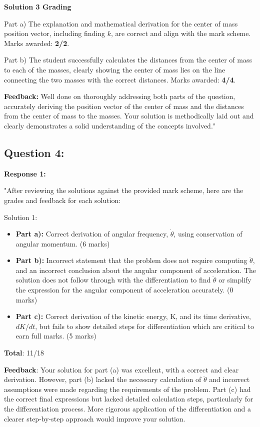\documentclass[a4paper,11pt]{article}
\begin{document}
\hrulefill

\textbf{Solution 3 Grading}

Part a) The explanation and mathematical derivation for the center of mass position vector, including finding \( k \), are correct and align with the mark scheme. Marks awarded: \textbf{2/2}.

Part b) The student successfully calculates the distances from the center of mass to each of the masses, clearly showing the center of mass lies on the line connecting the two masses with the correct distances. Marks awarded: \textbf{4/4}.

\textbf{Feedback:} Well done on thoroughly addressing both parts of the question, accurately deriving the position vector of the center of mass and the distances from the center of mass to the masses. Your solution is methodically laid out and clearly demonstrates a solid understanding of the concepts involved."

\subsection*{Question 4:}

\textbf{Response 1:}

"After reviewing the solutions against the provided mark scheme, here are the grades and feedback for each solution:

Solution 1:

\begin{itemize}
    \item \textbf{Part a):} Correct derivation of angular frequency, $\dot{\theta}$, using conservation of angular momentum. (6 marks)
    \item \textbf{Part b):} Incorrect statement that the problem does not require computing $\ddot{\theta}$, and an incorrect conclusion about the angular component of acceleration. The solution does not follow through with the differentiation to find $\ddot{\theta}$ or simplify the expression for the angular component of acceleration accurately. (0 marks)
    \item \textbf{Part c):} Correct derivation of the kinetic energy, K, and its time derivative, $dK/dt$, but fails to show detailed steps for differentiation which are critical to earn full marks. (5 marks)
\end{itemize}

\textbf{Total}: 11/18

\textbf{Feedback}: Your solution for part (a) was excellent, with a correct and clear derivation. However, part (b) lacked the necessary calculation of $\ddot{\theta}$ and incorrect assumptions were made regarding the requirements of the problem. Part (c) had the correct final expressions but lacked detailed calculation steps, particularly for the differentiation process. More rigorous application of the differentiation and a clearer step-by-step approach would improve your solution.
\end{document}
